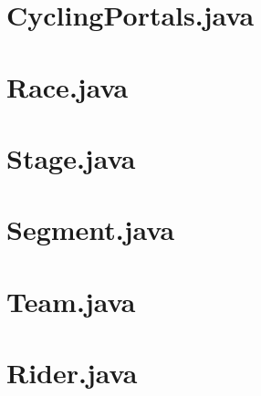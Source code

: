 \documentclass{article}
\begin{document}
\section{CyclingPortals.java}


\section{Race.java}


\section{Stage.java}


\section{Segment.java}


\section{Team.java}


\section{Rider.java}

\end{document}

